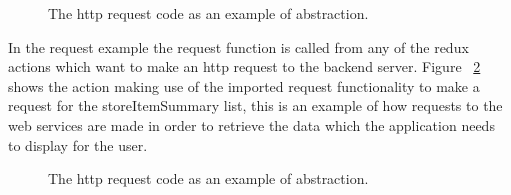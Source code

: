 \documentclass[a4paper,11pt]{report}
\begin{document}
\begin{figure}[H]
\centering
{}
\caption{The http request code as an example of abstraction.}
\label{fig:request}
\end{figure}

In the request example the request function is called from any of the redux actions which want to make an http request to the
backend server. Figure ~\ref{fig:actionExample} shows the action making use of the imported request functionality to make a request 
for the storeItemSummary list, this is an example of how requests to the web services are made in order to retrieve the data which the application
needs to display for the user.

\begin{figure}[H]
    \centering
    \caption{The http request code as an example of abstraction.}
    \label{fig:actionExample}
    \end{figure}
\end{document}
